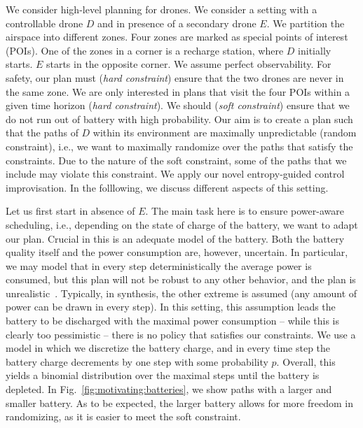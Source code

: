 We consider high-level planning for drones. We consider a setting with a controllable drone $D$ and in presence of a secondary drone $E$. 
We partition the airspace into different zones. Four zones are marked as special points of interest (POIs).
One of the zones in a corner is a recharge station, where $D$ initially starts. $E$ starts in the opposite corner. We assume perfect observability.  
For safety, our plan must (\emph{hard constraint}) ensure that the two drones are never in the same zone. We are only interested in plans that visit the four POIs within a given time horizon (\emph{hard constraint}).
We should (\emph{soft constraint}) ensure that we do not run out of battery with high probability. 
Our aim is to create a plan such that the paths of $D$ within its environment are maximally unpredictable (random constraint), i.e., we want to maximally randomize over the paths that satisfy the constraints. Due to the nature of the soft constraint, some of the paths that we include may violate this constraint.  We apply our novel entropy-guided control improvisation. In the folllowing, we discuss different aspects of this setting.

Let us first start in absence of $E$. 
The main task here is to ensure power-aware scheduling, i.e., depending on the state of charge of the battery, we want to adapt our plan. Crucial in this is an adequate model of the battery. 
Both the battery quality itself and the power consumption are, however, uncertain. 
In particular, we may model that in every step deterministically the average power is consumed, but this plan will not be robust to any other behavior, and the plan is unrealistic~\cite{DBLP:conf/cyphy/HermannsKN15}. Typically, in synthesis, the other extreme is assumed (any amount of power can be drawn in every step). In this setting, this assumption leads the battery to be discharged with the maximal power consumption -- while this is clearly too pessimistic -- there is no policy that satisfies our constraints.
We use a model in which we discretize the battery charge, and in every time step the battery charge decrements by one step with some probability $p$. 
Overall, this yields a binomial distribution over the maximal steps until the battery is depleted.
In Fig.~\ref{fig:motivating:batteries}, we show paths with a larger and smaller battery. As to be expected, the larger battery allows for more freedom in randomizing, as it is easier to meet the soft constraint.


